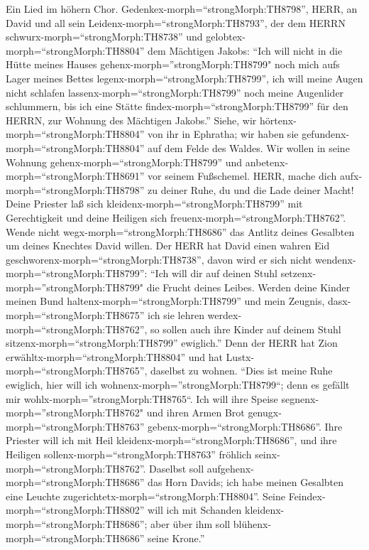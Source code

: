  Ein Lied im höhern Chor.
Gedenkex-morph=``strongMorph:TH8798'', HERR, an David und all sein
Leidenx-morph=``strongMorph:TH8793'',  der dem HERRN
schwurx-morph=``strongMorph:TH8738'' und
gelobtex-morph=``strongMorph:TH8804'' dem Mächtigen Jakobs: 
``Ich will nicht in die Hütte meines Hauses
gehenx-morph=''strongMorph:TH8799" noch mich aufs Lager meines Bettes
legenx-morph=``strongMorph:TH8799'',  ich will meine Augen
nicht schlafen lassenx-morph=``strongMorph:TH8799'' noch meine
Augenlider schlummern,  bis ich eine Stätte
findex-morph=``strongMorph:TH8799'' für den HERRN, zur Wohnung des
Mächtigen Jakobs.''  Siehe, wir
hörtenx-morph=``strongMorph:TH8804'' von ihr in Ephratha; wir haben sie
gefundenx-morph=``strongMorph:TH8804'' auf dem Felde des Waldes.
 Wir wollen in seine Wohnung
gehenx-morph=``strongMorph:TH8799'' und
anbetenx-morph=``strongMorph:TH8691'' vor seinem Fußschemel.
 HERR, mache dich aufx-morph=``strongMorph:TH8798'' zu
deiner Ruhe, du und die Lade deiner Macht!  Deine Priester
laß sich kleidenx-morph=``strongMorph:TH8799'' mit Gerechtigkeit und
deine Heiligen sich freuenx-morph=``strongMorph:TH8762''. 
Wende nicht wegx-morph=``strongMorph:TH8686'' das Antlitz deines
Gesalbten um deines Knechtes David willen.  Der HERR hat
David einen wahren Eid geschworenx-morph=``strongMorph:TH8738'', davon
wird er sich nicht wendenx-morph=``strongMorph:TH8799'': ``Ich will dir
auf deinen Stuhl setzenx-morph=''strongMorph:TH8799" die Frucht deines
Leibes.  Werden deine Kinder meinen Bund
haltenx-morph=``strongMorph:TH8799'' und mein Zeugnis,
dasx-morph=``strongMorph:TH8675'' ich sie lehren
werdex-morph=``strongMorph:TH8762'', so sollen auch ihre Kinder auf
deinem Stuhl sitzenx-morph=``strongMorph:TH8799'' ewiglich.''
 Denn der HERR hat Zion
erwähltx-morph=``strongMorph:TH8804'' und hat
Lustx-morph=``strongMorph:TH8765'', daselbst zu wohnen. 
``Dies ist meine Ruhe ewiglich, hier will ich
wohnenx-morph=''strongMorph:TH8799``; denn es gefällt mir
wohlx-morph=''strongMorph:TH8765``.  Ich will ihre Speise
segnenx-morph=''strongMorph:TH8762" und ihren Armen Brot
genugx-morph=``strongMorph:TH8763'' gebenx-morph=``strongMorph:TH8686''.
 Ihre Priester will ich mit Heil
kleidenx-morph=``strongMorph:TH8686'', und ihre Heiligen
sollenx-morph=``strongMorph:TH8763'' fröhlich
seinx-morph=``strongMorph:TH8762''.  Daselbst soll
aufgehenx-morph=``strongMorph:TH8686'' das Horn Davids; ich habe meinen
Gesalbten eine Leuchte zugerichtetx-morph=``strongMorph:TH8804''.
 Seine Feindex-morph=``strongMorph:TH8802'' will ich mit
Schanden kleidenx-morph=``strongMorph:TH8686''; aber über ihm soll
blühenx-morph=``strongMorph:TH8686'' seine Krone.''

